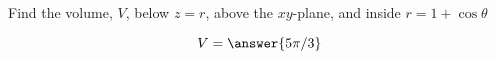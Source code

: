 \documentclass{ximera}
\author{David Guichard \and Neal Koblitz \and H. Jerome Keisler \and Albert Scheller \and Barry Balof \and Mike Wills \and Matthew Carr}
\begin{document}
\begin{exercise}





Find the volume, $V$, below $z=r$, above the $xy$-plane, and inside $r=1+\cos\theta$
\begin{prompt}
\[
V=\answer{5\pi/3}
\]
\end{prompt}



\end{exercise}
\end{document}
